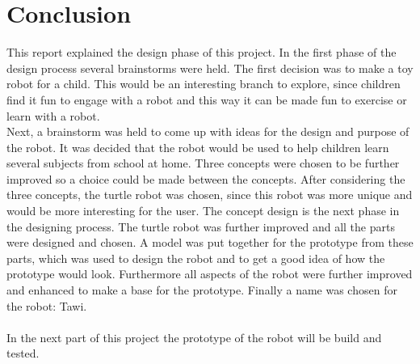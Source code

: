 \documentclass[11pt,twoside,a4paper]{report}
\begin{document}
\chapter{Conclusion}
This report explained the design phase of this project. In the first phase of the design process several brainstorms were held. The first decision was to make a toy robot for a child. This would be an interesting branch to explore, since children find it fun to engage with a robot and this way it can be made fun to exercise or learn with a robot. \\
Next, a brainstorm was held to come up with ideas for the design and purpose of the robot. It was decided that the robot would be used to help children learn several subjects from school at home. Three concepts were chosen to be further improved so a choice could be made between the concepts. After considering the three concepts, the turtle robot was chosen, since this robot was more unique and would be more interesting for the user.
The concept design is the next phase in the designing process. The turtle robot was further improved and all the parts were designed and chosen. A model was put together for the prototype from these parts, which was used to design the robot and to get a good idea of how the prototype would look. Furthermore all aspects of the robot were further improved and enhanced to make a base for the prototype. Finally a name was chosen for the robot: Tawi.\\
 \\
In the next part of this project the prototype of the robot will be build and tested.
\end{document}
